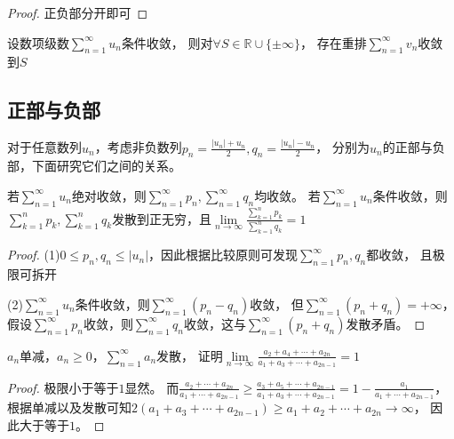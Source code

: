 \begin{proof}
  正负部分开即可
\end{proof}

\begin{theorem}
  设数项级数$\sum\limits_{n = 1}^{\infty}u_n$条件收敛，
  则对$\forall S \in \mathbb{R} \cup \{\pm \infty\}$，
  存在重排$\sum\limits_{n = 1}^{\infty}v_n$收敛到$S$
\end{theorem}


\subsection{正部与负部}

对于任意数列$u_n$，考虑非负数列$p_n = \frac{|u_n| + u_n}{2}, q_n = \frac{|u_n| - u_n}{2}$，
分别为$u_n$的正部与负部，下面研究它们之间的关系。

\begin{theorem}[正负部]
  若$\sum\limits_{n = 1}^{\infty}u_n$绝对收敛，则$\sum\limits_{n = 1}^{\infty}p_n, \sum\limits_{n = 1}^{\infty}q_n$均收敛。
  若$\sum\limits_{n = 1}^{\infty}u_n$条件收敛，则$\sum\limits_{k = 1}^np_k, \sum\limits_{k = 1}^nq_k$发散到正无穷，且$\lim \limits _{n \rightarrow \infty} \frac{\sum\limits_{k = 1}^n p_k}{\sum\limits_{k = 1}^n q_k} = 1$
\end{theorem}

\begin{proof}
  (1)$0 \leq p_n, q_n \leq |u_n|$，因此根据比较原则可发现$\sum\limits_{n = 1}^{\infty}p_n,q_n$都收敛，
  且极限可拆开

  (2)$\sum\limits_{n = 1}^{\infty}u_n$条件收敛，则$\sum\limits_{n = 1}^{\infty}(p_n - q_n)$收敛，
  但$\sum\limits_{n = 1}^{\infty}(p_n + q_n) = +\infty$，
  假设$\sum\limits_{n = 1}^{\infty}p_n$收敛，则$\sum\limits_{n = 1}^{\infty}q_n$收敛，这与$\sum\limits_{n = 1}^{\infty}(p_n + q_n)$发散矛盾。
\end{proof}

\begin{exercise}
  $a_n$单减，$a_n \geq 0$，$\sum\limits_{n = 1}^{\infty}a_n$发散，
  证明$\lim \limits _{n \rightarrow \infty} \frac{a_2 + a_4 + \cdots + a_{2n}}{a_1 + a_3 + \cdots + a_{2n-1}} = 1$
\end{exercise}

\begin{proof}
  极限小于等于$1$显然。
  而$\frac{a_2 + \cdots + a_{2n}}{a_1 + \cdots + a_{2n-1}} \geq \frac{a_3 + a_5 + \cdots + a_{2n-1}}{a_1 + a_3 + \cdots + a_{2n-1}} = 1 - \frac{a_1}{a_1 + \cdots + a_{2n-1}}$，
  根据单减以及发散可知$2(a_1 + a_3 + \cdots + a_{2n-1}) \geq a_1 + a_2 + \cdots + a_{2n} \rightarrow \infty$，
  因此大于等于$1$。
\end{proof}





